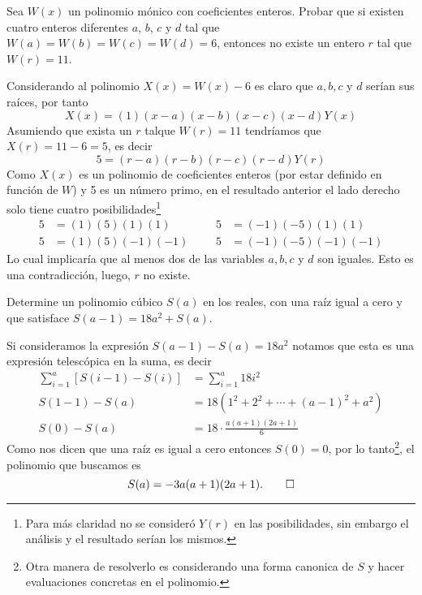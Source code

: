 \begin{prob}
    Sea $W(x)$ un polinomio mónico con coeficientes enteros.
    Probar que si existen cuatro enteros diferentes $a$, $b$, $c$ y $d$ tal que $W(a) = W(b) = W(c) = W(d) = 6$,
    entonces no existe un entero $r$ tal que $W(r) = 11$.
\end{prob}

\begin{solution}
    Considerando al polinomio $X(x) = W(x) - 6$ es claro que $a, b, c$ y $d$ serían sus raíces, por tanto
    \[
        X(x) = (1)(x - a)(x - b)(x - c)(x - d)Y(x)
    \]
    Asumiendo que exista un $r$ talque $W(r) = 11$ tendríamos que $X(r) = 11 - 6 = 5$, es decir
    \[
        5 = (r - a)(r - b)(r - c)(r - d)Y(r)
    \]
    Como $X(x)$ es un polinomio de coeficientes enteros (por estar definido en función de $W$) y 5 es un número primo, en el resultado anterior el lado derecho solo tiene cuatro posibilidades\footnote{Para más claridad no se consideró $Y(r)$ en las posibilidades, sin embargo el análisis y el resultado serían los mismos.}
    \begin{align*}
        5 &= (1)(5)(1)(1) && &5 &= (-1)(-5)(1)(1)\\
        5 &= (1)(5)(-1)(-1) && &5 &= (-1)(-5)(-1)(-1)
    \end{align*}
    Lo cual implicaría que al menos dos de las variables $a, b, c$ y $d$ son iguales.
    Esto es una contradicción, luego, $r$ no existe.
\end{solution}

\begin{prob}
    Determine un polinomio cúbico $S(a)$ en los reales, con una raíz igual a cero y que satisface $S(a - 1) = 18a^2 + S(a)$.
\end{prob}

\begin{solution}
    Si consideramos la expresión $S(a - 1) - S(a) = 18 a^2$ notamos que esta es una expresión telescópica en la suma, es decir
    \begin{align*}
        \sum_{i = 1}^{a} \left[S(i - 1) - S(i)\right] &= \sum_{i = 1}^{a} 18 i^2\\
        S(1 - 1) - S(a) &= 18 \left(1^2 + 2^2 + \cdots + (a - 1)^2 + a^2\right)\\
        S(0) - S(a) &= 18\cdot \frac{a(a + 1)(2a + 1)}{6}
    \end{align*}
    Como nos dicen que una raíz es igual a cero entonces $S(0) = 0$, por lo tanto\footnote{Otra manera de resolverlo es considerando una forma canonica de $S$ y hacer evaluaciones concretas en el polinomio.}, el polinomio que buscamos es
    \[
        S(a) = -3a(a + 1)(2a + 1). \qedhere
    \]
\end{solution}